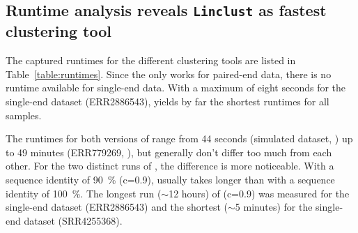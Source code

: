 \documentclass[12pt,a4paper,english]{article}
\begin{document}
	\subsection{Runtime analysis reveals \texttt{Linclust} as fastest clustering tool}
		
        The captured runtimes for the different clustering tools are listed in Table~\ref{table:runtimes}. Since the \orp only works for paired-end data, there is no runtime available for single-end data. With a maximum of eight seconds for the single-end \celegans dataset (ERR2886543), \linclust yields by far the shortest runtimes for all samples.

		The runtimes for both versions of \mclust range from 44 seconds (simulated dataset, \mclusttwo) up to 49 minutes (ERR779269, \mclust), but generally don't differ too much from each other.
		For the two distinct runs of \cdhit, the difference is more noticeable. With a sequence identity of 90~\% (c=0.9), \cdhit usually takes longer than with a sequence identity of 100~\%. The longest run ($\sim$12 hours) of \cdhit (c=0.9) was measured for the single-end \celegans dataset (ERR2886543) and the shortest ($\sim$5 minutes) for the single-end \ecoli dataset (SRR4255368).
\end{document}
